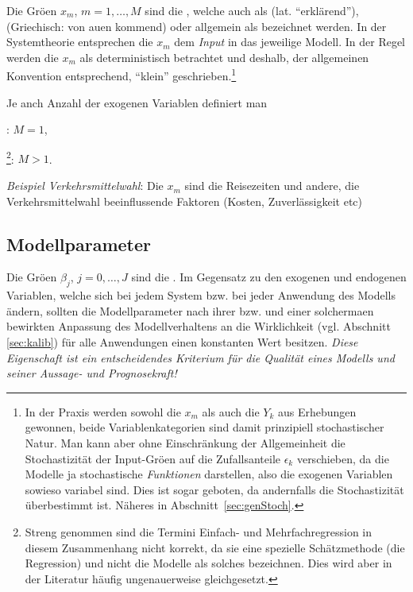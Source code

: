 Die Gr\"o\3en $x_m$, $m=1, \ldots, M$ sind die  , welche auch als  
 (lat. ``erkl\"arend''), 
 (Griechisch: von au\3en kommend) 
oder allgemein als
 bezeichnet werden.
 In der Systemtheorie
entsprechen die $x_m$ dem \textit{Input} in das jeweilige Modell.
In der Regel werden die $x_m$ als deterministisch betrachtet und
deshalb, der allgemeinen Konvention entsprechend, ``klein'' 
geschrieben.\footnote{In der Praxis werden sowohl die $x_m$ als auch
die $Y_k$ aus Erhebungen gewonnen, beide Variablenkategorien sind
damit  prinzipiell
stochastischer Natur. Man kann aber ohne
Einschr\"ankung der Allgemeinheit die Stochastizit\"at der
Input-Gr\"o\3en auf die Zufallsanteile $\epsilon_k$
verschieben, da die Modelle ja stochastische \textit{Funktionen}
darstellen, also die exogenen Variablen sowieso variabel sind. Dies
ist sogar geboten, da andernfalls die Stochastizit\"at
\"uberbestimmt ist. N\"aheres in Abschnitt~\ref{sec:genStoch}.}

Je anch Anzahl der exogenen Variablen definiert man
\bi
\item {}: $M=1$,
\item {}\footnote{Streng genommen sind die
Termini Einfach- und Mehrfachregression in diesem Zusammenhang 
nicht korrekt, da sie eine spezielle Sch\"atzmethode (die Regression)
und nicht die Modelle als solches bezeichnen. Dies wird aber in der
Literatur h\"aufig ungenauerweise gleichgesetzt.}: $M>1$.
\ei

\textit{Beispiel Verkehrsmittelwahl}: Die $x_m$ sind die Reisezeiten
und andere, die Verkehrsmittelwahl beeinflussende Faktoren (Kosten,
Zuverl\"assigkeit etc)

\subsection{Modellparameter}

Die Gr\"o\3en $\beta_j$, $j=0, \ldots, J$ sind die . Im
Gegensatz zu den exogenen und endogenen Variablen, welche sich bei
jedem System bzw. bei jeder Anwendung des
Modells \"andern, sollten die Modellparameter nach ihrer
 bzw.  und einer
solcherma\3en bewirkten Anpassung des Modellverhaltens an die 
Wirklichkeit (vgl. Abschnitt
\ref{sec:kalib}) f\"ur alle Anwendungen
einen konstanten Wert besitzen.
\textit{Diese Eigenschaft ist ein entscheidendes Kriterium f\"ur die
Qualit\"at eines Modells und seiner Aussage- und Prognosekraft!}

